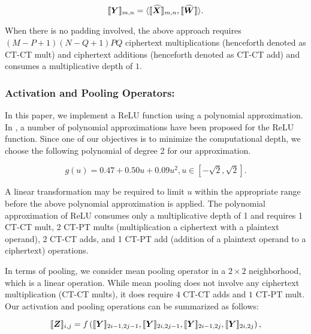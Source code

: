 \documentclass[letterpaper]{article} %
\newcommand{\vect}[1]{\mbox{\boldmath$#1$}}
\begin{document}
\begin{equation}
    \label{eqn:enc_conv}
        \llbracket \vect{Y} \rrbracket_{m,n} = \langle \llbracket \vect{\widehat{X}} \rrbracket_{m,n},  \llbracket \vect{\widehat{W}} \rrbracket\rangle.
    \end{equation}

When there is no padding involved, the above approach requires $(M-P+1)(N-Q+1)PQ$ ciphertext multiplications (henceforth denoted as CT-CT mult) and ciphertext additions (henceforth denoted as CT-CT add) and consumes a multiplicative depth of $1$.

\subsubsection{Activation and Pooling Operators:}

In this paper, we implement a ReLU function using a polynomial approximation. In \cite{PolyAct}, a number of polynomial approximations have been proposed for the ReLU function. Since one of our objectives is to minimize the computational depth, we choose the following polynomial of degree 2 for our approximation.

\begin{equation} \label{eqn:approxReLU}
    g(u) = 0.47 + 0.50u + 0.09u^2, u \in [-\sqrt{2},\sqrt{2}].
\end{equation}

\noindent A linear transformation may be required to limit $u$ within the appropriate range before the above polynomial approximation is applied. The polynomial approximation of ReLU consumes only a multiplicative depth of 1 and requires 1 CT-CT mult, 2 CT-PT mults (multiplication a ciphertext with a plaintext operand), 2 CT-CT adds, and 1 CT-PT add (addition of a plaintext operand to a ciphertext) operations.

In terms of pooling, we consider mean pooling operator in a $2 \times 2$ neighborhood, which is a linear operation. While mean pooling does not involve any ciphertext multiplication (CT-CT mults), it does require $4$ CT-CT adds and $1$ CT-PT mult. Our activation and pooling operations can be summarized as follows:

\begin{equation}
    \llbracket \vect{Z} \rrbracket_{i,j} = f\left(\llbracket \vect{Y} \rrbracket_{2i-1,2j-1},\llbracket \vect{Y} \rrbracket_{2i,2j-1},\llbracket \vect{Y} \rrbracket_{2i-1,2j},\llbracket \vect{Y} \rrbracket_{2i,2j}\right),
\end{equation}
\end{document}
